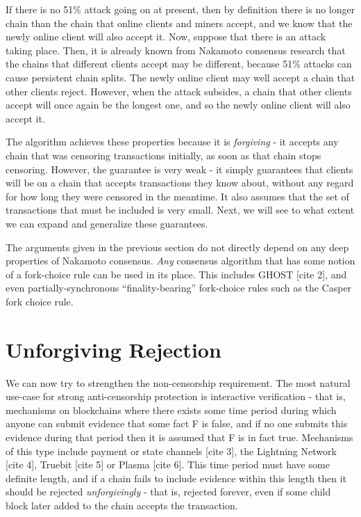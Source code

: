 \documentclass[12pt]{article}
\begin{document}
If there is no 51\% attack going on at present, then by definition there is no longer chain than the chain that online clients and miners accept, and we know that the newly online client will also accept it. Now, suppose that there is an attack taking place. Then, it is already known from Nakamoto consensus research that the chains that different clients accept may be different, because 51\% attacks can cause persistent chain splits. The newly online client may well accept a chain that other clients reject. However, when the attack subsides, a chain that other clients accept will once again be the longest one, and so the newly online client will also accept it.

The algorithm achieves these properties because it is \textit{forgiving} - it accepts any chain that was censoring transactions initially, as soon as that chain stops censoring. However, the guarantee is very weak - it simply guarantees that clients will be on a chain that accepts transactions they know about, without any regard for how long they were censored in the meantime. It also assumes that the set of transactions that must be included is very small. Next, we will see to what extent we can expand and generalize these guarantees.

The arguments given in the previous section do not directly depend on any deep properties of Nakamoto consensus. \textit{Any} consensus algorithm that has some notion of a fork-choice rule can be used in its place. This includes GHOST [cite 2], and even partially-synchronous ``finality-bearing'' fork-choice rules such as the Casper fork choice rule.

\section{Unforgiving Rejection}

We can now try to strengthen the non-censorship requirement. The most natural use-case for strong anti-censorship protection is interactive verification - that is, mechanisms on blockchains where there exists some time period during which anyone can submit evidence that some fact F is false, and if no one submits this evidence during that period then it is assumed that F is in fact true. Mechanisms of this type include payment or state channels [cite 3], the Lightning Network [cite 4], Truebit [cite 5] or Plasma [cite 6]. This time period must have some definite length, and if a chain fails to include evidence within this length then it should be rejected \textit{unforgivingly} - that is, rejected forever, even if some child block later added to the chain accepts the transaction.
\end{document}
